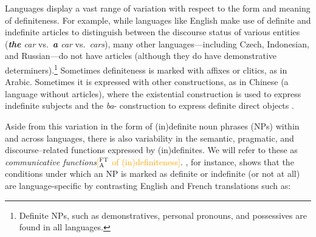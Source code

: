 \documentclass[11pt,letterpaper]{article}
\newcommand{\ensuretext}[1]{#1}
\newcommand{\ftamarker}{\ensuretext{\textcolor{orange}{\ensuremath{^{\textsc{FT}}_{\textsc{A}}}}}}
\newcommand{\arkcomment}[3]{\ensuretext{\textcolor{#3}{[#1 #2]}}}
\newcommand{\fta}[1]{\arkcomment{\ftamarker}{#1}{orange}}
\newcommand{\llbl}[1]{\mbox{\textsc{#1}}} %
\begin{document}
Languages display a vast range of variation with respect to the form and meaning of definiteness. 
For example, while languages like English make use of definite and indefinite articles 
to distinguish between the discourse status of various entities ({\it \textbf{the} car} vs.~{\it \textbf{a} car} vs.~{\it cars}), 
many other languages---including Czech, Indonesian, and Russian---do not have articles
(although they do have demonstrative determiners).\footnote{Definite NPs, such as demonstratives, personal pronouns, and possessives are found in all languages.}  
Sometimes definiteness is marked with affixes or clitics, as in Arabic. Sometimes it is expressed with other constructions,
as in Chinese (a language without articles), where the existential construction is used to express indefinite subjects 
and the {\it ba}- construction to express definite direct objects \citep{chen04}. 

Aside from this variation in the form of (in)definite noun phrases (NPs) within and across languages, there is also variability 
in the semantic, pragmatic, and discourse--related functions expressed by (in)definites.   
We will refer to these as {\em communicative functions}\fta{of (in)definiteness}.  
, for instance, shows that the conditions under which an NP 
is marked as definite or indefinite (or not at all) 
are language-specific by contrasting English and French translations such as:
\end{document}
